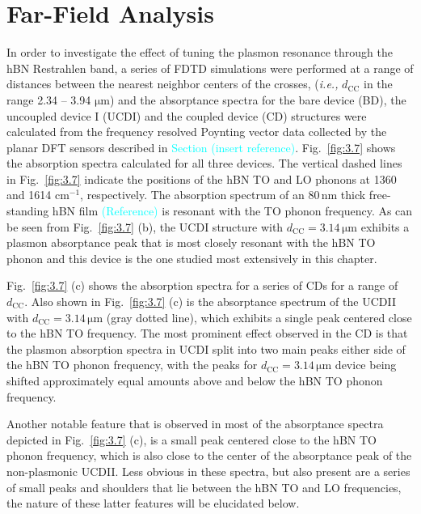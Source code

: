 \documentclass[preprint,
amsmath,amssymb,
aip,
jap,
floatfix,]{revtex4-2}
\begin{document}
		\section{Far-Field Analysis}
		\label{sec:FFA}

			In order to investigate the effect of tuning the plasmon resonance through the hBN Restrahlen band, a series of FDTD simulations were performed at a range of distances between the nearest neighbor centers of the crosses, (\textit{i.e.,} $d_\mathrm{CC}$ in the range 2.34 -- 3.94 $\si{\um}$) and the absorptance spectra for the bare device (BD), the uncoupled device I (UCDI) and the coupled device (CD) structures were calculated from the frequency resolved Poynting vector data collected by the planar DFT sensors described in \textcolor{cyan}{Section (insert reference)}.  Fig.~\ref{fig:3.7} shows the absorption spectra calculated for all three devices. The vertical dashed lines in  Fig.~\ref{fig:3.7} indicate the positions of the hBN TO and LO phonons at 1360 and 1614 $\mathrm{cm}^{-1}$, respectively. The absorption spectrum of an $80\,\si{\nm}$ thick free-standing hBN film \textcolor{cyan}{(Reference)} is resonant with the TO phonon frequency. As can be seen from Fig.~\ref{fig:3.7} (b), the UCDI structure with $d_\mathrm{CC} = 3.14\,\si{\um}$ exhibits a plasmon absorptance peak that is most closely resonant with the hBN TO phonon and this device is the one studied most extensively in this chapter.

			Fig.~\ref{fig:3.7} (c) shows the absorption spectra for a series of CDs for a range of  $d_\mathrm{CC}$. Also shown in Fig.~\ref{fig:3.7} (c) is the absorptance spectrum of the UCDII with $d_\mathrm{CC} = 3.14\,\si{\um}$ (gray dotted line), which exhibits a single peak centered close to the hBN TO frequency. The most prominent effect observed in the CD is that the plasmon absorption spectra in UCDI split into two main peaks either side of the hBN TO phonon frequency, with the peaks for $d_\mathrm{CC} = 3.14\,\si{\um}$ device being shifted approximately equal amounts above and below the hBN TO phonon frequency.

			Another notable feature that is observed in most of the absorptance spectra depicted in Fig.~\ref{fig:3.7} (c), is a small peak centered close to the hBN TO phonon frequency, which is also close to  the center of the absorptance peak of the non-plasmonic UCDII. Less obvious in these spectra, but also present are a series of small peaks and shoulders that lie between the hBN TO and LO frequencies, the nature of these latter features will be elucidated below.  
\end{document}
